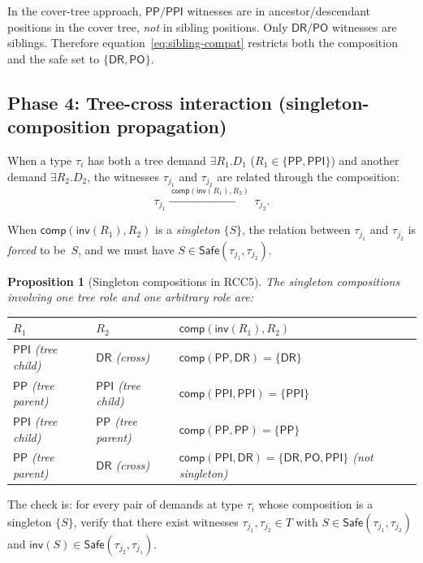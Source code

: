 \documentclass[a4paper,11pt]{article}
\newtheorem{proposition}[theorem]{Proposition}
\theoremstyle{definition}
\newcommand{\DR}{\ensuremath{\mathsf{DR}}}
\newcommand{\PO}{\ensuremath{\mathsf{PO}}}
\newcommand{\PP}{\ensuremath{\mathsf{PP}}}
\newcommand{\PPI}{\ensuremath{\mathsf{PPI}}}
\newcommand{\inv}{\ensuremath{\mathsf{inv}}}
\newcommand{\comp}{\ensuremath{\mathsf{comp}}}
\newcommand{\Safe}{\ensuremath{\mathsf{Safe}}}
\begin{document}
In the cover-tree approach, $\PP/\PPI$ witnesses are in
ancestor/descendant positions in the cover tree, \emph{not}
in sibling positions.  Only $\DR/\PO$ witnesses are siblings.
Therefore equation~\eqref{eq:sibling-compat} restricts both the
composition and the safe set to $\{\DR,\PO\}$.

\subsection{Phase 4: Tree-cross interaction (singleton-composition propagation)}
\label{sec:singleton}

When a type $\tau_i$ has both a tree demand $\exists R_1.D_1$
($R_1 \in \{\PP,\PPI\}$) and another demand $\exists R_2.D_2$,
the witnesses $\tau_{j_1}$ and $\tau_{j_2}$ are related through
the composition:
\begin{equation}
  \tau_{j_1} \xrightarrow{\;\comp(\inv(R_1), R_2)\;}
  \tau_{j_2}.
  \label{eq:composition-chain}
\end{equation}

When $\comp(\inv(R_1), R_2)$ is a \emph{singleton} $\{S\}$,
the relation between $\tau_{j_1}$ and $\tau_{j_2}$ is
\emph{forced} to be~$S$, and we must have
$S \in \Safe(\tau_{j_1}, \tau_{j_2})$.

\begin{proposition}[Singleton compositions in RCC5]
\label{prop:singletons}
The singleton compositions involving one tree role and one
arbitrary role are:
\begin{center}
\renewcommand{\arraystretch}{1.2}
\begin{tabular}{lll}
\toprule
$R_1$ & $R_2$ & $\comp(\inv(R_1), R_2)$ \\
\midrule
$\PPI$ (tree child) & $\DR$ (cross) &
  $\comp(\PP, \DR) = \{\DR\}$ \\
$\PP$ (tree parent) & $\PPI$ (tree child) &
  $\comp(\PPI, \PPI) = \{\PPI\}$ \\
$\PPI$ (tree child) & $\PP$ (tree parent) &
  $\comp(\PP, \PP) = \{\PP\}$ \\
$\PP$ (tree parent) & $\DR$ (cross) &
  $\comp(\PPI, \DR) = \{\DR,\PO,\PPI\}$ \textit{(not singleton)} \\
\bottomrule
\end{tabular}
\end{center}
\end{proposition}

The check is: for every pair of demands at type $\tau_i$
whose composition is a singleton $\{S\}$, verify that there
exist witnesses $\tau_{j_1}, \tau_{j_2} \in T$ with
$S \in \Safe(\tau_{j_1}, \tau_{j_2})$
and $\inv(S) \in \Safe(\tau_{j_2}, \tau_{j_1})$.
\end{document}
